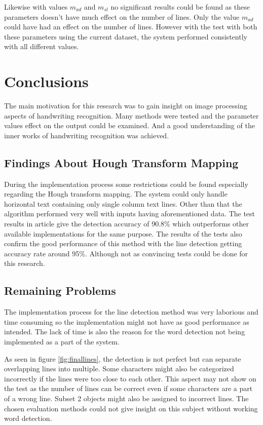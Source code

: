 \documentclass{article}
\begin{document}
    Likewise with values $m_{ad}$ and $m_{sl}$ no significant results could be found as these parameters doesn't have much effect on the number of lines. Only the value $m_{ad}$ could have had an effect on the number of lines. However with the test with both these parameters using the current dataset, the system performed consistently with all different values.

  \newpage
  \section{Conclusions}
    The main motivation for this research was to gain insight on image processing aspects of handwriting recognition. Many methods were tested and the parameter values effect on the output could be examined. And a good understanding of the inner works of handwriting recognition was achieved.

    \subsection{Findings About Hough Transform Mapping}
      During the implementation process some restrictions could be found especially regarding the Hough transform mapping. The system could only handle horizontal text containing only single column text lines. Other than that the algorithm performed very well with inputs having aforementioned data. The test results in article \cite{Louloudis2} give the detection accuracy of 90.8\% which outperforms other available implementations for the same purpose. The results of the tests also confirm the good performance of this method with the line detection getting accuracy rate around 95\%. Although not as convincing tests could be done for this research.

    \subsection{Remaining Problems}
    \label{sec:remainingproblems}
      The implementation process for the line detection method was very laborious and time consuming so the implementation might not have as good performance as intended. The lack of time is also the reason for the word detection not being implemented as a part of the system.

      As seen in figure \ref{fig:finallines}, the detection is not perfect but can separate overlapping lines into multiple. Some characters might also be categorized incorrectly if the lines were too close to each other. This aspect may not show on the test as the number of lines can be correct even if some characters are a part of a wrong line. Subset 2 objects might also be assigned to incorrect lines. The chosen evaluation methods could not give insight on this subject without working word detection.
\end{document}
